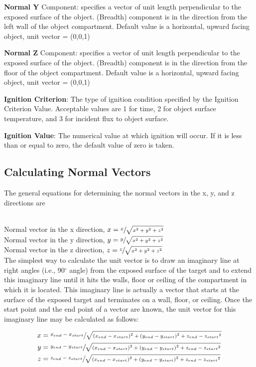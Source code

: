 \textbf{Normal  Y} Component: specifies a vector of unit length perpendicular to the exposed surface of the object. (Breadth) component is in the direction from the left wall of the object compartment. Default value is a horizontal, upward facing object, unit vector = (0,0,1)

\textbf{Normal  Z} Component: specifies a vector of unit length perpendicular to the exposed surface of the object. (Breadth) component is in the direction from the floor of the object compartment. Default value is a horizontal, upward facing object, unit vector = (0,0,1)

\textbf{Ignition Criterion}: The type of ignition condition specified by the Ignition Criterion Value. Acceptable values are 1 for time, 2 for object surface temperature, and 3 for incident flux to object surface.

\textbf{Ignition Value}: The numerical value at which ignition will occur. If it is less than or equal to zero, the default value of zero is taken.

\subsection{Calculating Normal Vectors}

The general equations for determining the normal vectors in the x, y, and z directions are \\~

Normal vector in the x direction, $x = \sfrac{x}{\sqrt{x^2 + y^2 + z^2}}$ \\

Normal vector in the y direction, $y = \sfrac{y}{\sqrt{x^2 + y^2 + z^2}}$ \\

Normal vector in the z direction, $z = \sfrac{z}{\sqrt{x^2 + y^2 + z^2}}$ \\

The simplest way to calculate the unit vector is to draw an imaginary line at right angles (i.e., 90$^\circ$ angle) from the exposed surface of the target and to extend this imaginary line until it hits the walls, floor or ceiling of the compartment in which it is located.  This imaginary line is actually a vector that starts at the surface of the exposed target and terminates on a wall, floor, or ceiling.  Once the start point and the end point of a vector are known, the unit vector for this imaginary line may be calculated as follows:

\begin{equation}
  \begin{aligned}
 x &= \sfrac{x_{end} - x_{start}}{\sqrt{{ \left( {x_{end} - x_{start}} \right) }^2 + { \left( {y_{end} - y_{start}} \right) }^2 + {z_{end} - z_{start}}^2}} \\
 y &= \sfrac{y_{end} - y_{start}}{\sqrt{{ \left( {x_{end} - x_{start}} \right) }^2 + { \left( {y_{end} - y_{start}} \right) }^2 + {z_{end} - z_{start}}^2}} \\
 z &= \sfrac{z_{end} - z_{start}}{\sqrt{{ \left( {x_{end} - x_{start}} \right) }^2 + { \left( {y_{end} - y_{start}} \right) }^2 + {z_{end} - z_{start}}^2}}
  \end{aligned}
\end{equation}

